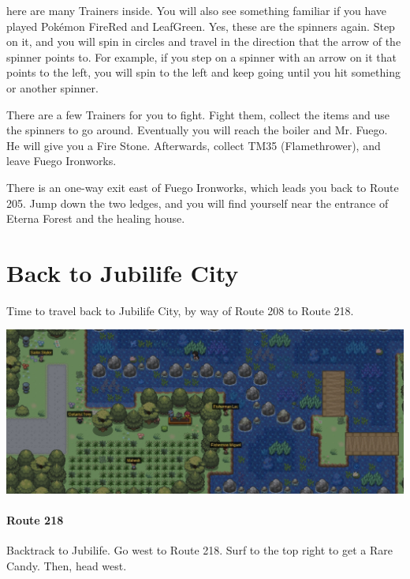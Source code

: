\documentclass[11pt]{article}
\begin{document}
here are many Trainers inside.
You will also see something familiar if you have played
Pokémon FireRed and LeafGreen.
Yes, these are the spinners again.
Step on it, and you will spin in circles and travel in the direction
that the arrow of the spinner points to.
For example, if you step on a spinner with an arrow on it that points to the left,
you will spin to the left and keep going until you hit something or another spinner.

There are a few Trainers for you to fight.
Fight them, collect the items and use the spinners to go around.
Eventually you will reach the boiler and Mr. Fuego.
He will give you a Fire Stone.
Afterwards, collect TM35 (Flamethrower), and leave Fuego Ironworks.

There is an one-way exit east of Fuego Ironworks, which leads you back to Route 205.
Jump down the two ledges, and you will find yourself near the entrance of
Eterna Forest and the healing house.






\section{Back to Jubilife City}\label{sec:back-to-jubilife-city}
Time to travel back to Jubilife City, by way of Route 208 to Route 218.

\includegraphics[width=\textwidth]{walkthrough/Sinnoh/Route_218}

\paragraph{Route 218}
Backtrack to Jubilife.
Go west to Route 218.
Surf to the top right to get a Rare Candy.
Then, head west.
\end{document}
